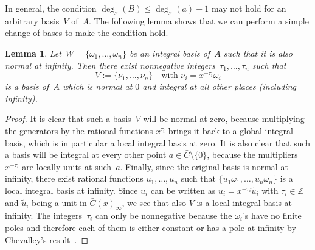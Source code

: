 \documentclass{sig-alternate}
\newtheorem{lemma}[theorem]{Lemma}
\let\set\mathbb
\begin{document}
In general, the condition $\deg_x(B) \leq \deg_x(a)-1$ may not hold for an arbitrary basis~$V$ of~$A$.
The following lemma shows that we can perform a simple change of bases to make the condition hold.

\begin{lemma}\label{LM:CB}
Let~$W =\{\omega_1, \ldots, \omega_n\}$ be an integral basis of~$A$ such that it is also normal at infinity. Then
there exist nonnegative integers~$\tau_1, \ldots, \tau_n$ such that
\[ V := \{\nu_1, \ldots, \nu_n\} \quad \text{with $\nu_i = x^{-\tau_i} \omega_i$}\]
is a basis of~$A$ which is normal at $0$ and integral at all other places (including infinity).
\end{lemma}
\begin{proof}
It is clear that such a basis~$V$ will be normal at zero, because multiplying the generators by
the rational functions $x^{\tau_i}$ brings it back to a global integral basis, which is in particular
a local integral basis at zero.
It is also clear that such a basis will be integral at every other point $a\in\bar C\setminus\{0\}$, because the
multipliers $x^{-\tau_i}$ are locally units at such~$a$.
Finally, since the original basis is normal at infinity, there exist rational functions $u_1,\dots,u_n$
such that $\{u_1\omega_1,\dots,u_n\omega_n\}$ is a local integral basis at infinity.
Since $u_i$ can be written as $u_i=x^{-\tau_i}\tilde{u}_i$ with $\tau_i\in\set Z$ and $\tilde{u}_i$ being a unit
in $\bar{C}(x)_\infty$, we see that also $V$ is a local integral basis at infinity.
The integers~$\tau_i$ can only be nonnegative because the $\omega_i$'s have no finite poles and therefore each
of them is either constant or has a pole at infinity by Chevalley's result~\cite[Page 9, Corollary 3]{Chevalley1951}.
\end{proof}
\end{document}
